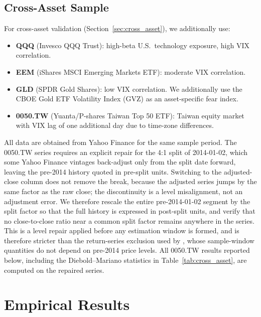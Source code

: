 \documentclass[12pt,a4paper]{article}
\begin{document}
\subsection{Cross-Asset Sample}

For cross-asset validation (Section~\ref{sec:cross_asset}), we additionally use:
\begin{itemize}
\item \textbf{QQQ} (Invesco QQQ Trust): high-beta U.S.\ technology exposure, high VIX correlation.
\item \textbf{EEM} (iShares MSCI Emerging Markets ETF): moderate VIX correlation.
\item \textbf{GLD} (SPDR Gold Shares): low VIX correlation. We additionally use the CBOE Gold ETF Volatility Index (GVZ) as an asset-specific fear index.
\item \textbf{0050.TW} (Yuanta/P-shares Taiwan Top 50 ETF): Taiwan equity market with VIX lag of one additional day due to time-zone differences.
\end{itemize}

All data are obtained from Yahoo Finance for the same sample period. The 0050.TW series requires an explicit repair for the 4:1 split of 2014-01-02, which some Yahoo Finance vintages back-adjust only from the split date forward, leaving the pre-2014 history quoted in pre-split units. Switching to the adjusted-close column does not remove the break, because the adjusted series jumps by the same factor as the raw close; the discontinuity is a level misalignment, not an adjustment error. We therefore rescale the entire pre-2014-01-02 segment by the split factor so that the full history is expressed in post-split units, and verify that no close-to-close ratio near a common split factor remains anywhere in the series. This is a level repair applied before any estimation window is formed, and is therefore stricter than the return-series exclusion used by \citet{lai2026vt}, whose sample-window quantities do not depend on pre-2014 price levels. All 0050.TW results reported below, including the Diebold--Mariano statistics in Table~\ref{tab:cross_asset}, are computed on the repaired series.


\section{Empirical Results}
\label{sec:results}
\end{document}
